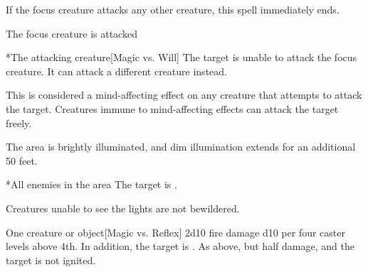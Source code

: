 \begin{spellheader}
    \spellspecial If the focus creature attacks any other creature, this spell immediately ends.
\end{spellheader}
\begin{spelleffects}
    \begin{spelltrigger}{The focus creature is attacked}
        \begin{spelltarget}*{The attacking creature}[Magic vs. Will]
            \spellsuccess The target is unable to attack the focus creature. It can attack a different creature instead.
        \end{spelltarget}
    \end{spelltrigger}

\end{spelleffects}
\begin{spellfooter}
    \spellnotes This is considered a mind-affecting effect on any creature that attempts to attack the target. Creatures immune to mind-affecting effects can attack the target freely.
\end{spellfooter}

\begin{spellheader}
    \spelldur{\durshort}
\end{spellheader}
\begin{spelleffects}
    \spellline
    \spelleffect The area is brightly illuminated, and dim illumination extends for an additional 50 feet.
    \begin{spelltarget}*{All enemies in the area}
        \spelleffect The target is \bewildered.
    \end{spelltarget}
\end{spelleffects}
\begin{spellfooter}
    \spellnotes Creatures unable to see the lights are not bewildered.
\end{spellfooter}

\begin{spellheader}
    \spellrng{\rngclose}
    \spelldur{\durshort}
\end{spellheader}
\begin{spelleffects}
    \begin{spelltarget}{One creature or object}[Magic vs. Reflex]
        \spellsuccess 2d10 fire damage \add d10 per four caster levels above 4th. In addition, the target is \ignited.
        \spellfailure As above, but half damage, and the target is not ignited.
    \end{spelltarget}
\end{spelleffects}

